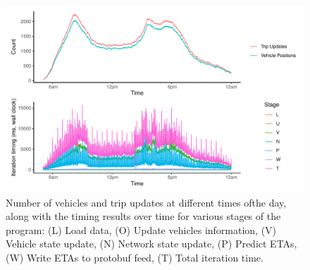 \begin{knitrout}\small
{}\color{fgcolor}\begin{figure}

{\centering \includegraphics[width=\textwidth]{figure/prediction_timing_time-1} 

}

\caption[Number of vehicles and trip updates at different times ofthe day, along with the timing results over time for various stages of the program]{Number of vehicles and trip updates at different times ofthe day, along with the timing results over time for various stages of the program: (L) Load data, (O) Update vehicles information, (V) Vehicle state update, (N) Network state update, (P) Predict ETAs, (W) Write ETAs to protobuf feed, (T) Total iteration time.}\label{fig:prediction_timing_time}
\end{figure}


\end{knitrout}
